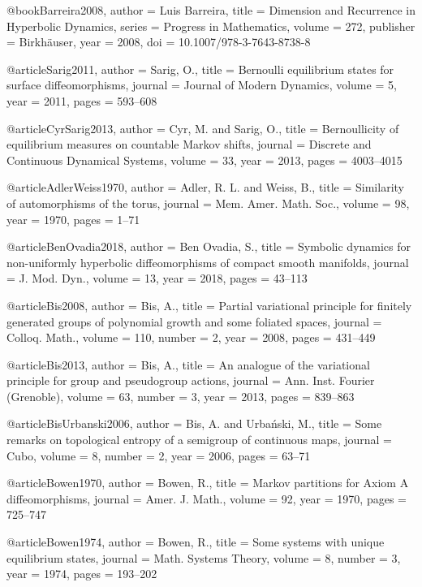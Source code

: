 @book{Barreira2008,
  author    = {Luis Barreira},
  title     = {Dimension and Recurrence in Hyperbolic Dynamics},
  series    = {Progress in Mathematics},
  volume    = {272},
  publisher = {Birkh{\"a}user},
  year      = {2008},
  doi       = {10.1007/978-3-7643-8738-8}
}



@article{Sarig2011,
  author = {Sarig, O.},
  title = {Bernoulli equilibrium states for surface diffeomorphisms},
  journal = {Journal of Modern Dynamics},
  volume = {5},
  year = {2011},
  pages = {593--608}
}

@article{CyrSarig2013,
  author = {Cyr, M. and Sarig, O.},
  title = {Bernoullicity of equilibrium measures on countable {Markov} shifts},
  journal = {Discrete and Continuous Dynamical Systems},
  volume = {33},
  year = {2013},
  pages = {4003--4015}
}

@article{AdlerWeiss1970,
  author = {Adler, R. L. and Weiss, B.},
  title = {Similarity of automorphisms of the torus},
  journal = {Mem. Amer. Math. Soc.},
  volume = {98},
  year = {1970},
  pages = {1--71}
}

@article{BenOvadia2018,
  author = {Ben Ovadia, S.},
  title = {Symbolic dynamics for non-uniformly hyperbolic diffeomorphisms of compact smooth manifolds},
  journal = {J. Mod. Dyn.},
  volume = {13},
  year = {2018},
  pages = {43--113}
}

@article{Bis2008,
  author = {Bis, A.},
  title = {Partial variational principle for finitely generated groups of polynomial growth and some foliated spaces},
  journal = {Colloq. Math.},
  volume = {110},
  number = {2},
  year = {2008},
  pages = {431--449}
}

@article{Bis2013,
  author = {Bis, A.},
  title = {An analogue of the variational principle for group and pseudogroup actions},
  journal = {Ann. Inst. Fourier (Grenoble)},
  volume = {63},
  number = {3},
  year = {2013},
  pages = {839--863}
}

@article{BisUrbanski2006,
  author = {Bis, A. and Urbański, M.},
  title = {Some remarks on topological entropy of a semigroup of continuous maps},
  journal = {Cubo},
  volume = {8},
  number = {2},
  year = {2006},
  pages = {63--71}
}

@article{Bowen1970,
  author = {Bowen, R.},
  title = {Markov partitions for Axiom A diffeomorphisms},
  journal = {Amer. J. Math.},
  volume = {92},
  year = {1970},
  pages = {725--747}
}

@article{Bowen1974,
  author = {Bowen, R.},
  title = {Some systems with unique equilibrium states},
  journal = {Math. Systems Theory},
  volume = {8},
  number = {3},
  year = {1974},
  pages = {193--202}
}

